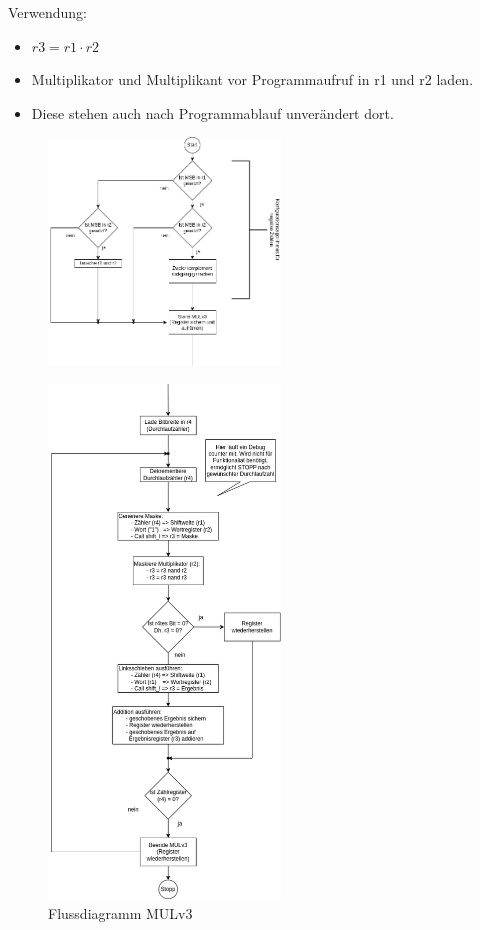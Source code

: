 \documentclass[fleqn, a4paper, 1pt]{article}       %
\begin{document}
\noindent Verwendung:
\begin{itemize}
	\item $r3 = r1 \cdot r2$
	\item Multiplikator und Multiplikant vor Programmaufruf in r1 und r2 laden.
	\item Diese stehen auch nach Programmablauf unverändert                dort.
\end{itemize}
\vspace{4cm}
\begin{figure}[h]
    \centering
    \includegraphics[width =0.55\textwidth]{MULv3-1.png}
\label{fig:bitw_Mul_Prinzip}
\end{figure}

\newpage

\begin{figure}[h]
    \centering
    \includegraphics[width =0.55\textwidth]{MULv3-2.png}
\caption{Flussdiagramm MULv3}
\label{fig:bitw_Mul_Prinzip}
\end{figure}


%




\newpage
\printbibliography  %
\end{document}
